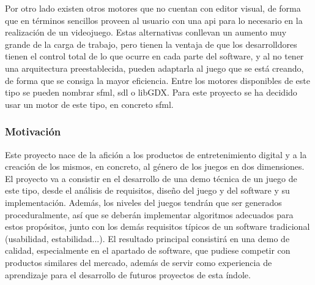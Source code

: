 			Por otro lado existen otros motores que no cuentan con editor visual, de forma que en términos sencillos proveen al usuario con una \acrshort{api} para lo necesario en la realización de un videojuego. Estas alternativas conllevan un aumento muy grande de la carga de trabajo, pero tienen la ventaja de que los desarrolldores tienen el control total de lo que ocurre en cada parte del software, y al no tener una arquitectura preestablecida, pueden adaptarla al juego que se está creando, de forma que se consiga la mayor eficiencia. Entre los motores disponibles de este tipo se pueden nombrar \acrshort{sfml}, \acrshort{sdl} o libGDX. Para este proyecto se ha decidido usar un motor de este tipo, en concreto \acrshort{sfml}.

		\subsubsection{Motivación}

			Este proyecto nace de la afición a los productos de entretenimiento digital y a la creación de los mismos, en concreto, al género de los juegos en dos dimensiones. El proyecto va a consistir en el desarrollo de una demo técnica de un juego de este tipo, desde el análisis de requisitos, diseño del juego y del software y su implementación. Además, los niveles del juegos tendrán que ser generados proceduralmente, así que se deberán implementar algoritmos adecuados para estos propósitos, junto con los demás requisitos típicos de un software tradicional (usabilidad, estabilidad...). El resultado principal consistirá en una demo de calidad, especialmente en el apartado de software, que pudiese competir con productos similares del mercado, además de servir como experiencia de aprendizaje para el desarrollo de futuros proyectos de esta índole.
